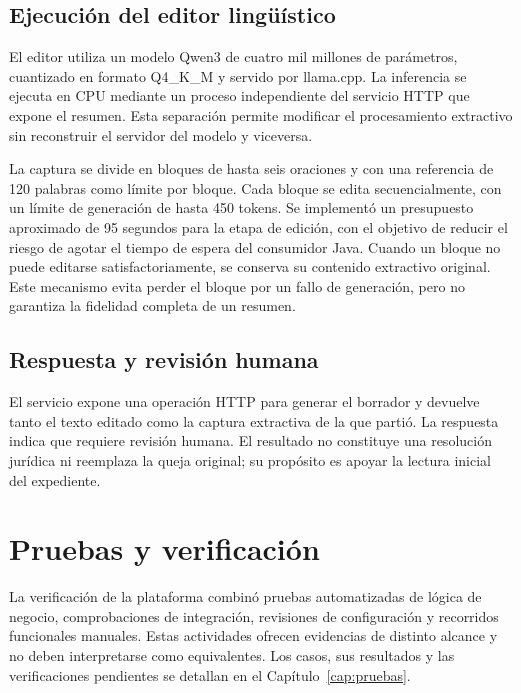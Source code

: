\subsection{Ejecución del editor lingüístico}
El editor utiliza un modelo Qwen3 de cuatro mil millones de parámetros,
cuantizado en formato Q4\_K\_M y servido por llama.cpp. La inferencia se ejecuta
en CPU mediante un proceso independiente del servicio HTTP que expone el
resumen. Esta separación permite modificar el procesamiento extractivo sin
reconstruir el servidor del modelo y viceversa.

La captura se divide en bloques de hasta seis oraciones y con una referencia
de 120 palabras como límite por bloque. Cada bloque se edita secuencialmente,
con un límite de generación de hasta 450 tokens. Se implementó un presupuesto
aproximado de 95 segundos para la etapa de edición, con el objetivo de reducir
el riesgo de agotar el tiempo de espera del consumidor Java. Cuando un bloque
no puede editarse satisfactoriamente, se conserva su contenido extractivo
original. Este mecanismo evita perder el bloque por un fallo de generación,
pero no garantiza la fidelidad completa de un resumen.

\subsection{Respuesta y revisión humana}
El servicio expone una operación HTTP para generar el borrador y devuelve tanto
el texto editado como la captura extractiva de la que partió. La respuesta
indica que requiere revisión humana. El resultado no constituye una resolución
jurídica ni reemplaza la queja original; su propósito es apoyar la lectura
inicial del expediente.


\section{Pruebas y verificación}
\label{sec:pruebas}
La verificación de la plataforma combinó pruebas automatizadas de lógica de negocio,
comprobaciones de integración, revisiones de configuración y recorridos funcionales
manuales. Estas actividades ofrecen evidencias de distinto alcance y no deben
interpretarse como equivalentes. Los casos, sus resultados y las verificaciones
pendientes se detallan en el Capítulo~\ref{cap:pruebas}.

